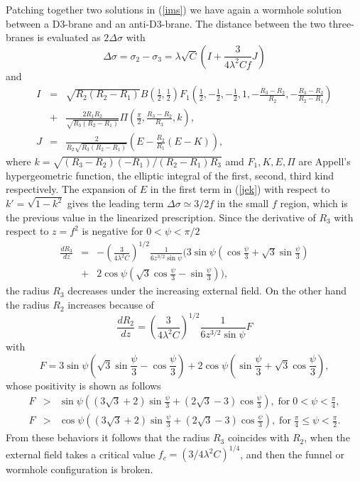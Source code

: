 \documentclass[12pt,a4paper]{article}
\newcommand{\la}{\lambda}
\begin{document}
Patching together two solutions in (\ref{ims}) we have again a
wormhole solution between a D3-brane and an anti-D3-brane. The distance
between the two three-branes is evaluated as $2\Delta \sigma$ with
\begin{equation}
\Delta \sigma = \sigma_2 - \sigma_3 = \la\sqrt{C}\left( I + 
\frac{3}{4\la^2Cf} J \right)
\label{del}\end{equation}
and
\begin{eqnarray}
I &=& \sqrt{R_2(R_2-R_1)}B\left(\frac{1}{2},\frac{1}{2}\right)F_1
\left(\frac{1}{2},-\frac{1}{2},-\frac{1}{2},1,-\frac{R_3-R_2}{R_2},
-\frac{R_3-R_2}{R_2-R_1}\right) \nonumber \\
&+& \frac{2R_1R_2}{\sqrt{R_3(R_2-R_1)}}
\Pi\left(\frac{\pi}{2},\frac{R_3-R_2}{R_3},k\right),  \\
J &=& \frac{2}{R_2\sqrt{R_3(R_2-R_1)}}\left(E - \frac{R_2}{R_1}
(E-K) \right),
\label{jek}\end{eqnarray}
where $k = \sqrt{(R_3-R_2)(-R_1)/(R_2-R_1)R_3}$ amd $F_1, K, E, \Pi$ are
Appell's hypergeometric function, the elliptic integral of the first,
second, third kind respectively. The expansion of $E$ in the first
term in (\ref{jek}) with respect to $k'=\sqrt{1-k^2}$ gives the
leading term $\Delta\sigma \simeq 3/2f$ in the small $f$ region,
which is the previous value in the linearized prescription.
Since the derivative of $R_3$ with respect to $z = f^2$ is negative for
$0 < \psi <\pi/2$
\begin{eqnarray}
\frac{dR_3}{dz} &=& - \left(\frac{3}{4\la^2C}\right)^{1/2}\frac{1}
{6z^{3/2}\sin \psi}(3\sin \psi(\cos\frac{\psi}{3} + 
\sqrt{3}\sin\frac{\psi}{3}) \nonumber \\
&+& 2\cos\psi (\sqrt{3}\cos\frac{\psi}{3} 
-\sin\frac{\psi}{3}) ),
\end{eqnarray}
the radius $R_3$ decreases under the increasing external field. On the 
other hand the radius $R_2$ increases because of 
\begin{equation}
\frac{dR_2}{dz} =  \left(\frac{3}{4\la^2C}\right)^{1/2}\frac{1}
{6z^{3/2}\sin \psi}F
\end{equation}
with 
\begin{equation}
F = 3\sin \psi(\sqrt{3} \sin\frac{\psi}{3} - \cos \frac{\psi}{3})
+ 2\cos\psi(\sin\frac{\psi}{3} + \sqrt{3}\cos\frac{\psi}{3}),
\end{equation}
whose positivity is shown as follows
\begin{eqnarray}
F &>& \sin\psi\left((3\sqrt{3}+2)\sin\frac{\psi}{3} + (2\sqrt{3}-3)
\cos\frac{\psi}{3}\right), \; \mathrm{for}\; 0 < \psi < \frac{\pi}{4},
\nonumber \\
F &>& \cos\psi \left((3\sqrt{3}+2)\sin\frac{\psi}{3} + (2\sqrt{3}-3)
\cos\frac{\psi}{3}\right), \; \mathrm{for}\; \frac{\pi}{4} \le \psi 
< \frac{\pi}{2}.
\end{eqnarray}
From these behaviors it follows that the radius $R_3$ coincides with
$R_2$, when the external field takes a critical value 
$f_c = (3/4\la^2C)^{1/4}$,  and then the funnel or wormhole
configuration is broken. 
\end{document}
